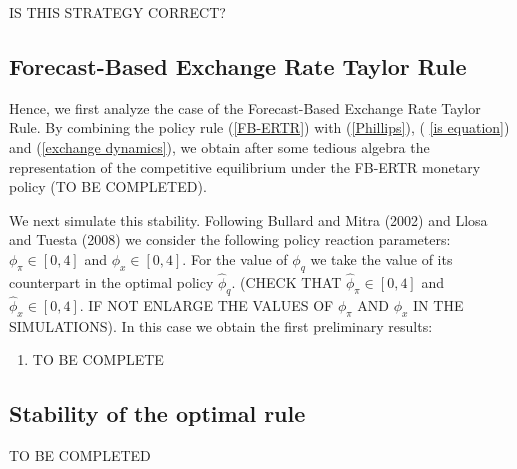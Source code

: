 \documentclass{article}
\begin{document}
IS THIS STRATEGY CORRECT?

\subsection{Forecast-Based Exchange Rate Taylor Rule}

Hence, we first analyze the case of the Forecast-Based Exchange Rate Taylor
Rule. By combining the policy rule (\ref{FB-ERTR}) with (\ref{Phillips}), (%
\ref{is equation}) and (\ref{exchange dynamics}), we obtain after some
tedious algebra the representation of the competitive equilibrium under the
FB-ERTR monetary policy (TO BE COMPLETED).

We next simulate this stability. Following Bullard and Mitra (2002) and
Llosa and Tuesta (2008) we consider the following policy reaction
parameters: $\phi _{\pi }\in \left[ 0,4\right] $ and $\phi _{x}\in \left[ 0,4%
\right] .$ For the value of $\phi _{q}$ we take the value of its counterpart
in the optimal policy $\widehat{\phi }_{q}.$ (CHECK THAT $\widehat{\phi }%
_{\pi }\in \left[ 0,4\right] $ and $\widehat{\phi }_{x}\in \left[ 0,4\right]
.$ IF NOT ENLARGE THE VALUES OF $\phi _{\pi }$ AND $\phi _{x}$ IN THE
SIMULATIONS). In this case we obtain the first preliminary results:

\begin{enumerate}
\item TO BE COMPLETE
\end{enumerate}

\subsection{Stability of the optimal rule}

TO BE COMPLETED
\end{document}
